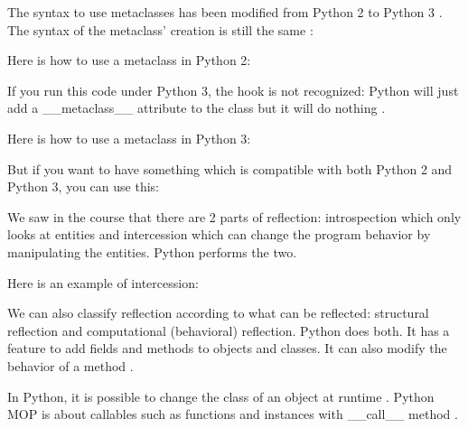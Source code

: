 The syntax to use metaclasses has been modified from Python 2 to Python 3 \cite{mikewatkins_metaclasses}. The syntax of the metaclass' creation is still the same \cite{python_doc_datamodel}:


Here is how to use a metaclass in Python 2:

If you run this code under Python 3, the hook is not recognized: Python will just add a \_\_metaclass\_\_ attribute to the class but it will do nothing \cite{artima_metaclasses_1of2}.
\newline

Here is how to use a metaclass in Python 3:


But if you want to have something which is compatible with both Python 2 and Python 3, you can use this:


We saw in the course that there are 2 parts of reflection: introspection which only looks at entities and intercession which can change the program behavior by manipulating the entities. %
Python performs the two.
\newline

Here is an example of intercession:


%
%
%
%
%
%
%
%
%
%
%

We can also classify reflection according to what can be reflected: structural reflection and computational (behavioral) reflection. %
Python does both. It has a feature to add fields and methods to objects and classes. It can also modify the behavior of a method \cite{mendez2011computational}.

In Python, it is possible to change the class of an object at runtime \cite{dynamic_lang_study}.
Python MOP is about callables such as functions and instances with \_\_call\_\_ method \cite{Russel_MOP}.

